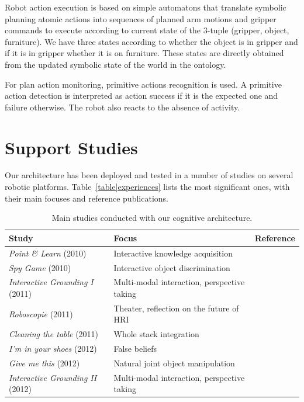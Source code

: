 \documentclass[preprint,3p,times]{elsarticle}
\begin{document}
Robot action execution is based on simple automatons  that translate
symbolic planning atomic actions into sequences of planned arm motions
and gripper commands to execute according to current state
of the 3-tuple (gripper, object, furniture). We have three states
according to whether the object is in gripper and if it is in gripper
whether it is on furniture.  These states are directly obtained from
the updated symbolic state of the world in the ontology.

For plan action monitoring, primitive actions recognition is used. A primitive
action detection is interpreted as action success if it is the expected one and
failure otherwise. The robot also reacts to the absence of activity.




\section{Support Studies}
\label{sec:expe}

Our architecture has been deployed and tested in a number of studies on
several robotic platforms. Table~\ref{table|experiences} lists the most
significant ones, with their main focuses and reference publications.

\begin{table}
\begin{center}

\begin{tabular}{lll}
 \bf{Study} & Focus & Reference \\
\hline
{\it Point \& Learn} (2010) & Interactive knowledge acquisition & \cite{Lemaignan2010} \\
{\it Spy Game} (2010) & Interactive object discrimination & \cite{Ros2010b} \\
{\it Interactive Grounding I} (2011) & Multi-modal interaction, perspective taking & \cite{lemaignan2011what} \\
{\it Roboscopie} (2011) & Theater, reflection on the future of HRI & \cite{lemaignan2012roboscopie} \\
{\it Cleaning the table} (2011) & Whole stack integration & \cite{Alami2011} \\
{\it I'm in your shoes} (2012) & False beliefs & \cite{warnier2012when} \\
{\it Give me this} (2012) & Natural joint object manipulation & \cite{gharbi2013natural} \\
{\it Interactive Grounding II} (2012) & Multi-modal interaction, perspective taking & \cite{lemaignan2013talking} \\
\hline

\end{tabular}
\end{center}
\caption{Main studies conducted with our cognitive architecture.}
\label{table|experiments}
\end{table}
\end{document}
